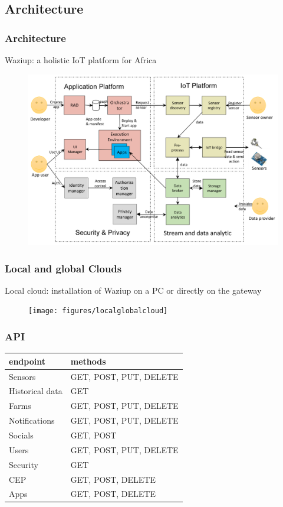 \documentclass{beamer}
\begin{document}
\subsection{Architecture}

\begin{frame}
\frametitle{Architecture}

Waziup: a holistic IoT platform for Africa
  \begin{figure} 
  \centering  
  \includegraphics[width=.9\linewidth]{figures/GlobalArch}   
  \label{figure-globalarch}  
  \end{figure} 
  
\end{frame}

\begin{frame}
\frametitle{Local and global Clouds}

  Local cloud: installation of Waziup on a PC or directly on the gateway

  \begin{figure}[H] 
  \centering  
  \texttt{[image: figures/localglobalcloud]}   
  \label{fig-localglobalcloud}  
  \end{figure}
    
\end{frame}

\begin{frame}
\frametitle{API}

  \begin{table}
  \begin{tabular}{l | l }
    endpoint & methods \\
    \hline
    Sensors & GET, POST, PUT, DELETE \\ 
    Historical data & GET \\
    Farms & GET, POST, PUT, DELETE\\
    Notifications & GET, POST, PUT, DELETE \\
    Socials & GET, POST\\
    Users & GET, POST, PUT, DELETE \\
    Security & GET \\
    CEP & GET, POST, DELETE \\
    Apps & GET, POST, DELETE 
  \end{tabular}
  \end{table}
  
    
\end{frame}
\end{document}
